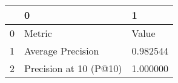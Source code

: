 \begin{tabular}{lll}
\toprule
 & 0 & 1 \\
\midrule
0 & Metric & Value \\
1 & Average Precision & 0.982544 \\
2 & Precision at 10 (P@10) & 1.000000 \\
\bottomrule
\end{tabular}
